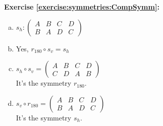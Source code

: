 \noindent\textbf{Exercise \ref{exercise:symmetries:CompSymm}:}
\begin{enumerate}[(a)]
\item
$s_h: \begin{pmatrix}
A & B & C & D\\
B & A & D & C
\end{pmatrix}$

\item
Yes, $r_{180}\circ s_v=s_h$

\item
$s_h\circ s_v=\begin{pmatrix}
A & B & C & D\\
C & D & A & B
\end{pmatrix}$\\
It's the symmetry $r_{180}$.

\item
$s_v\circ r_{180}=\begin{pmatrix}
A & B & C & D\\
B & A & D & C
\end{pmatrix}$\\
It's the symmetry $s_h$.
\end{enumerate}

